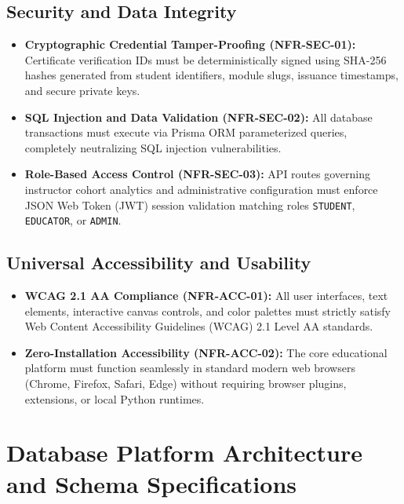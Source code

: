 \documentclass[11pt, a4paper]{article}
\begin{document}
\subsection{Security and Data Integrity}
\begin{itemize}
	\item \textbf{Cryptographic Credential Tamper-Proofing (NFR-SEC-01):} Certificate verification IDs must be deterministically signed using SHA-256 hashes generated from student identifiers, module slugs, issuance timestamps, and secure private keys.
	\item \textbf{SQL Injection and Data Validation (NFR-SEC-02):} All database transactions must execute via Prisma ORM parameterized queries, completely neutralizing SQL injection vulnerabilities.
	\item \textbf{Role-Based Access Control (NFR-SEC-03):} API routes governing instructor cohort analytics and administrative configuration must enforce JSON Web Token (JWT) session validation matching roles \texttt{STUDENT}, \texttt{EDUCATOR}, or \texttt{ADMIN}.
\end{itemize}

\subsection{Universal Accessibility and Usability}
\begin{itemize}
	\item \textbf{WCAG 2.1 AA Compliance (NFR-ACC-01):} All user interfaces, text elements, interactive canvas controls, and color palettes must strictly satisfy Web Content Accessibility Guidelines (WCAG) 2.1 Level AA standards.
	\item \textbf{Zero-Installation Accessibility (NFR-ACC-02):} The core educational platform must function seamlessly in standard modern web browsers (Chrome, Firefox, Safari, Edge) without requiring browser plugins, extensions, or local Python runtimes.
\end{itemize}

\newpage

\section{Database Platform Architecture and Schema Specifications}
\end{document}
